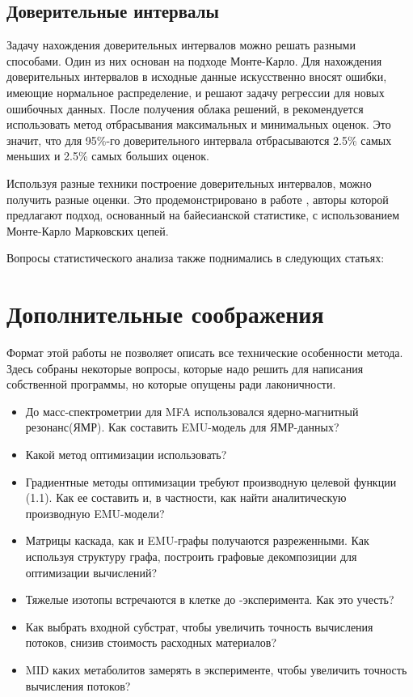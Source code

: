 \documentclass[14pt, a4paper]{extreport}
\begin{document}
\subsection{Доверительные интервалы}
Задачу нахождения доверительных интервалов можно решать разными способами. Один из них основан на подходе Монте-Карло. Для нахождения доверительных интервалов в исходные данные искусственно вносят ошибки, имеющие нормальное распределение, и решают задачу регрессии для новых ошибочных данных. После получения облака решений, в \cite{OpenFlux2} рекомендуется использовать метод отбрасывания максимальных и минимальных оценок. Это значит, что для 95\%-го доверительного интервала отбрасываются 2.5\% самых меньших и 2.5\% самых больших оценок.

Используя разные техники построение доверительных интервалов, можно получить разные оценки. Это продемонстрировано в работе \cite{bayesian}, авторы которой предлагают подход, основанный на байесианской статистике, с использованием Монте-Карло Марковских цепей.

Вопросы статистического анализа также поднимались в следующих статьях: \cite{Wiechert_1999_3, Wiechert_1999_4, ci_antoniewicz, bayesian, bayesian_2, bayesian_3}

\clearpage
\section{Дополнительные соображения}
Формат этой работы не позволяет описать все технические особенности метода. Здесь собраны некоторые вопросы, которые надо решить для написания собственной программы, но которые опущены ради лаконичности.
\begin{itemize}
	\item До масс-спектрометрии для MFA использовался ядерно-магнитный резонанс(ЯМР). Как составить EMU-модель для ЯМР-данных?\cite{EMU_2007}
	\item Какой метод оптимизации использовать?\cite{adjoint_approach, protocol, optimization_in_mfa} \cite[препринт]{2019_gradient}
	\item Градиентные методы оптимизации требуют производную целевой функции (1.1). Как ее составить и, в частности, как найти аналитическую производную EMU-модели? \cite{EMU_2007, protocol}
	\item Матрицы каскада, как и EMU-графы получаются разреженными. Как используя структуру графа, построить графовые декомпозиции для оптимизации вычислений? \cite{topology, emu_topology}
	\item Тяжелые изотопы встречаются в клетке до -эксперимента. Как это учесть?
	\item Как выбрать входной субстрат, чтобы увеличить точность вычисления потоков, снизив стоимость расходных материалов? \cite{planning_optimal, planning_optimal_2, planning_optimal_3, planning_optimal_4} 
	\item MID каких метаболитов замерять в эксперименте, чтобы увеличить точность вычисления потоков? \cite{optimal_measurements}
\end{itemize}
\end{document}
